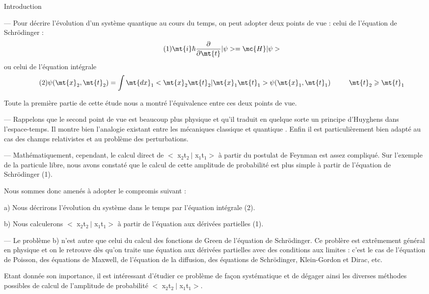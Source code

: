 \chapter{}%
\section{}%
Introduction

— Pour décrire l'évolution d'un système quantique au cours
du temps, on peut adopter deux points de vue : celui de l'équation de
Schrödinger :
\[
\tag{1}\mt{i}\hbar\frac{\partial}{\partial\mt{t}}|\psi>=\mc{H}|\psi>
\]
ou celui de l'équation intégrale
\[
\tag{2}\psi(\mt{x}_2,\mt{t}_2)=\int\mt{dx}_1<\mt{x}_2\mt{t}_2|\mt{x}_1\mt{t}_1>\psi(\mt{x}_1,\mt{t}_1)
\ \ \ \ \ \ \ \ \mt{t}_2\geqslant\mt{t}_1
\]

Toute la première partie de cette étude nous a montré l'équivalence entre ces deux points de vue.

— Rappelons que le second point de vue est beaucoup plus physique
et qu'il traduit en quelque sorte un principe d'Huyghens dans l'espace-temps.
Il montre bien l'analogie existant entre les mécaniques classique et quantique . Enfin il est particulièrement bien adapté au cas des champs relativistes et au problème des perturbations.

— Mathématiquement, cependant, le calcul direct de $<$ x$_2$t$_2\ |$ x$_1$t$_1>$
à partir du postulat de Feynman est assez compliqué. Sur l'exemple de la
particule libre, nous avons constaté que le calcul de cette amplitude de
probabilité est plus simple à partir de l'équation de Schrödinger (1).

Nous sommes donc amenés à adopter le compromis suivant :

a) Nous décrirons l'évolution du système dans le temps par l'équation intégrale (2).

b) Nous calculerons $<$ x$_2$t$_2\ |$ x$_1$t$_1>$ à partir de l'équation aux dérivées partielles (1).

 
— Le problème b) n'est autre que celui du calcul des fonctions
de Green de l'équation de Schrödinger. Ce problère est extrêmement général
en physique et on le retrouve dès qu'on traite une équation aux dérivées
partielles avec des conditions aux limites : c'est le cas de l'équation
de Poisson, des équations de Maxwell, de l'équation de la diffusion, des
équations de Schrödinger, Klein-Gordon et Dirac, etc.

Etant donnée son importance, il est intéressant d'étudier ce
problème de façon systématique et de dégager ainsi les diverses méthodes
possibles de calcul de l'amplitude de probabilité $<$ x$_2$t$_2\ |$ x$_1$t$_1>$.
